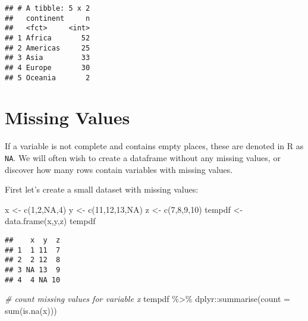 \documentclass[
]{book}
\newenvironment{Shaded}{\begin{snugshade}}{\end{snugshade}}
\newcommand{\AttributeTok}[1]{\textcolor[rgb]{0.77,0.63,0.00}{#1}}
\newcommand{\CommentTok}[1]{\textcolor[rgb]{0.56,0.35,0.01}{\textit{#1}}}
\newcommand{\ConstantTok}[1]{\textcolor[rgb]{0.00,0.00,0.00}{#1}}
\newcommand{\DecValTok}[1]{\textcolor[rgb]{0.00,0.00,0.81}{#1}}
\newcommand{\FunctionTok}[1]{\textcolor[rgb]{0.00,0.00,0.00}{#1}}
\newcommand{\NormalTok}[1]{#1}
\newcommand{\OtherTok}[1]{\textcolor[rgb]{0.56,0.35,0.01}{#1}}
\newcommand{\SpecialCharTok}[1]{\textcolor[rgb]{0.00,0.00,0.00}{#1}}
\begin{document}
\begin{verbatim}
## # A tibble: 5 x 2
##   continent     n
##   <fct>     <int>
## 1 Africa       52
## 2 Americas     25
## 3 Asia         33
## 4 Europe       30
## 5 Oceania       2
\end{verbatim}

\hypertarget{missing-values}{%
\section{Missing Values}\label{missing-values}}

If a variable is not complete and contains empty places, these are denoted in R as \texttt{NA}. We will often wish to create a dataframe without any missing values, or discover how many rows contain variables with missing values.

First let's create a small dataset with missing values:

\begin{Shaded}
\begin{Highlighting}[]
\NormalTok{x }\OtherTok{\textless{}{-}} \FunctionTok{c}\NormalTok{(}\DecValTok{1}\NormalTok{,}\DecValTok{2}\NormalTok{,}\ConstantTok{NA}\NormalTok{,}\DecValTok{4}\NormalTok{)}
\NormalTok{y }\OtherTok{\textless{}{-}} \FunctionTok{c}\NormalTok{(}\DecValTok{11}\NormalTok{,}\DecValTok{12}\NormalTok{,}\DecValTok{13}\NormalTok{,}\ConstantTok{NA}\NormalTok{)}
\NormalTok{z }\OtherTok{\textless{}{-}} \FunctionTok{c}\NormalTok{(}\DecValTok{7}\NormalTok{,}\DecValTok{8}\NormalTok{,}\DecValTok{9}\NormalTok{,}\DecValTok{10}\NormalTok{)}
\NormalTok{tempdf }\OtherTok{\textless{}{-}} \FunctionTok{data.frame}\NormalTok{(x,y,z)}
\NormalTok{tempdf}
\end{Highlighting}
\end{Shaded}

\begin{verbatim}
##    x  y  z
## 1  1 11  7
## 2  2 12  8
## 3 NA 13  9
## 4  4 NA 10
\end{verbatim}

\begin{Shaded}
\begin{Highlighting}[]
\CommentTok{\# count missing values for variable x}
\NormalTok{tempdf }\SpecialCharTok{\%\textgreater{}\%}
\NormalTok{  dplyr}\SpecialCharTok{::}\FunctionTok{summarise}\NormalTok{(}\AttributeTok{count =} \FunctionTok{sum}\NormalTok{(}\FunctionTok{is.na}\NormalTok{(x)))}
\end{Highlighting}
\end{Shaded}
\end{document}
